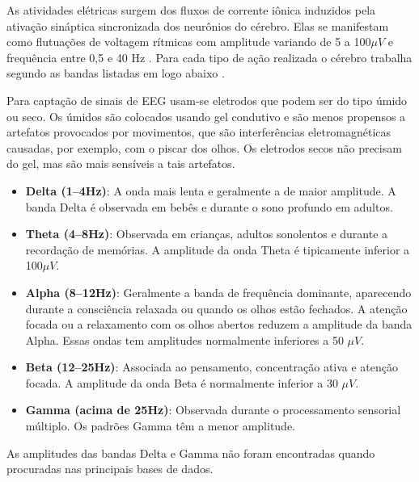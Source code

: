 			\par As atividades elétricas surgem dos fluxos de corrente iônica induzidos pela ativação sináptica sincronizada dos neurônios do cérebro. Elas se manifestam como flutuações de voltagem rítmicas com amplitude variando de 5 a 100$\mu V$ e frequência entre 0,5 e 40 Hz \cite{JALALYBIDGOLY2020101788}. Para cada tipo de ação realizada o cérebro trabalha segundo as bandas listadas em logo abaixo \cite{sanei2021eeg}.
			
			\par Para captação de sinais de EEG usam-se eletrodos que podem ser do tipo úmido ou seco. Os úmidos são colocados usando gel condutivo e são menos propensos a artefatos provocados por movimentos, que são interferências eletromagnéticas causadas, por exemplo, com o piscar dos olhos. Os eletrodos secos não precisam do gel, mas são mais sensíveis a tais artefatos.
			
			\begin{itemize}
				\item \textbf{Delta (1–4Hz)}: A onda mais lenta e geralmente a de maior amplitude. A banda Delta é observada em bebês e durante o sono profundo em adultos.
				
				\item \textbf{Theta (4–8Hz)}: Observada em crianças, adultos sonolentos e durante a recordação de memórias. A amplitude da onda Theta é tipicamente inferior a 100$\mu V$.
				
				\item \textbf{Alpha (8–12Hz)}: Geralmente a banda de frequência dominante, aparecendo durante a consciência relaxada ou quando os olhos estão fechados. A atenção focada ou a relaxamento com os olhos abertos reduzem a amplitude da banda Alpha. Essas ondas tem amplitudes normalmente inferiores a 50 $\mu V$.
				
				\item \textbf{Beta (12–25Hz)}: Associada ao pensamento, concentração ativa e atenção focada. A amplitude da onda Beta é normalmente inferior a 30 $\mu V$.
				
				\item \textbf{Gamma (acima de 25Hz)}: Observada durante o processamento sensorial múltiplo. Os padrões Gamma têm a menor amplitude.
				
			\end{itemize}
			
			\par As amplitudes das bandas Delta e Gamma não foram encontradas quando procuradas nas principais bases de dados.
			
